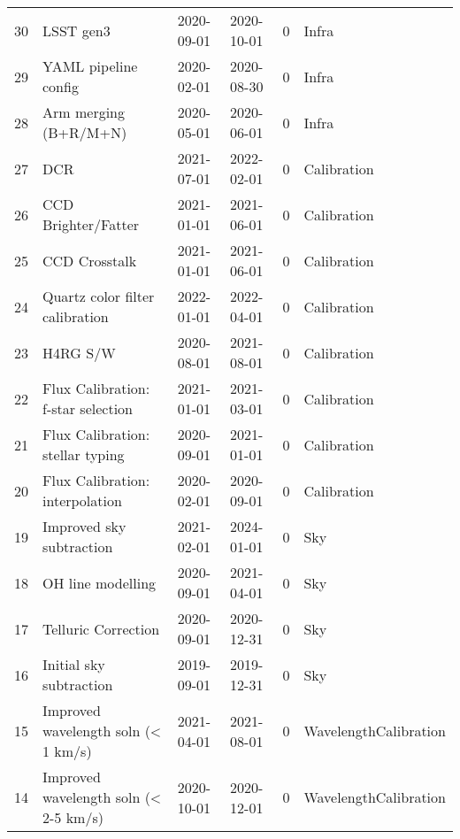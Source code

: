\begin{tabular}{llllrl}
30 &                                    LSST gen3 &  2020-09-01 &  2020-10-01 &         0 &                  Infra \\
29 &                         YAML pipeline config &  2020-02-01 &  2020-08-30 &         0 &                  Infra \\
28 &                        Arm merging (B+R/M+N) &  2020-05-01 &  2020-06-01 &         0 &                  Infra \\
27 &                                          DCR &  2021-07-01 &  2022-02-01 &         0 &            Calibration \\
26 &                          CCD Brighter/Fatter &  2021-01-01 &  2021-06-01 &         0 &            Calibration \\
25 &                                CCD Crosstalk &  2021-01-01 &  2021-06-01 &         0 &            Calibration \\
24 &              Quartz color filter calibration &  2022-01-01 &  2022-04-01 &         0 &            Calibration \\
23 &                                     H4RG S/W &  2020-08-01 &  2021-08-01 &         0 &            Calibration \\
22 &           Flux Calibration: f-star selection &  2021-01-01 &  2021-03-01 &         0 &            Calibration \\
21 &             Flux Calibration: stellar typing &  2020-09-01 &  2021-01-01 &         0 &            Calibration \\
20 &              Flux Calibration: interpolation &  2020-02-01 &  2020-09-01 &         0 &            Calibration \\
19 &                     Improved sky subtraction &  2021-02-01 &  2024-01-01 &         0 &                    Sky \\
18 &                            OH line modelling &  2020-09-01 &  2021-04-01 &         0 &                    Sky \\
17 &                          Telluric Correction &  2020-09-01 &  2020-12-31 &         0 &                    Sky \\
16 &                      Initial sky subtraction &  2019-09-01 &  2019-12-31 &         0 &                    Sky \\
15 &          Improved wavelength soln (< 1 km/s) &  2021-04-01 &  2021-08-01 &         0 &  WavelengthCalibration \\
14 &        Improved wavelength soln (< 2-5 km/s) &  2020-10-01 &  2020-12-01 &         0 &  WavelengthCalibration \\

\end{tabular}
